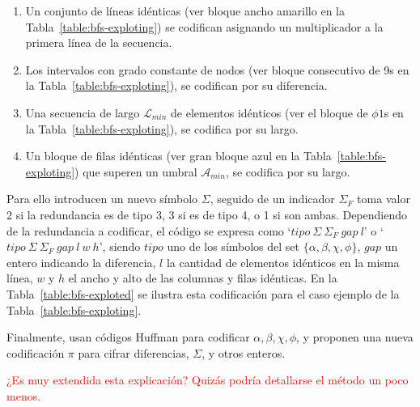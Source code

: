 \begin{enumerate}
	\item Un conjunto de líneas idénticas (ver bloque ancho amarillo en la Tabla~\ref{table:bfs-exploting}) se codifican asignando un multiplicador a la primera línea de la secuencia.
	\item Los intervalos con grado constante de nodos (ver bloque consecutivo de 9s en la Tabla~\ref{table:bfs-exploting}), se codifican por su diferencia.
	\item Una secuencia de largo $\mathcal{L}_{min}$ de elementos idénticos (ver el bloque de $\phi1$s en la Tabla~\ref{table:bfs-exploting}), se codifica por su largo.
	\item Un bloque de filas idénticas (ver gran bloque azul en la Tabla~\ref{table:bfs-exploting}) que superen un umbral $\mathcal{A}_{min}$, se codifica por su largo.
\end{enumerate}



Para ello introducen un nuevo símbolo $\Sigma$, seguido de un indicador $\Sigma_{F}$ toma valor 2 si la redundancia es de tipo 3, 3 si es de tipo 4, o 1 si son ambas. Dependiendo de la redundancia a codificar, el código se expresa como `$tipo\:\Sigma\:\Sigma_{F}\:gap\:l$'  o `$tipo\:\Sigma\:\Sigma_{F}\:gap\:l\:w\:h$', siendo $tipo$ uno de los símbolos del set $\{\alpha, \beta, \chi, \phi\}$, $gap$ un entero indicando la diferencia, $l$ la cantidad de elementos idénticos en la misma línea, $w$ y $h$ el ancho y alto de las columnas y filas idénticas. En la Tabla~\ref{table:bfs-exploted} se ilustra esta codificación para el caso ejemplo de la Tabla~\ref{table:bfs-exploting}.



Finalmente, usan códigos Huffman para codificar $\alpha, \beta, \chi, \phi$, y proponen una nueva codificación $\pi$ para cifrar diferencias, $\Sigma$, y otros enteros.

\textcolor{red}{¿Es muy extendida esta explicación? Quizás podría detallarse el método un poco menos.}


